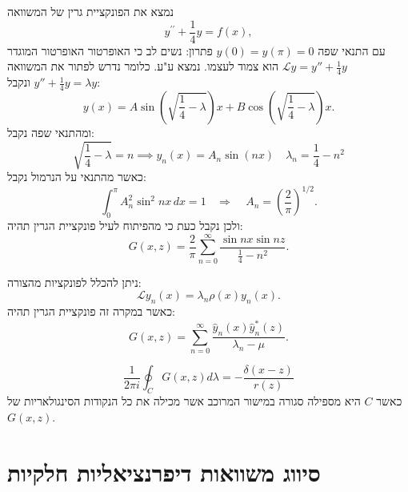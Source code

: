 \documentclass{tstextbook}
\begin{document}
\begin{example}
נמצא את הפונקציית גרין של המשוואה $$y^{\prime\prime}+{\textstyle{\frac{1}{4}}}y=f(x),$$
עם התנאי שפה \(y(0)=y\left( \pi \right)=0\)
פתרון:
נשים לב כי האופרטור האופרטור המוגדר \(\mathcal{L}y=y''+\frac{1}{4}y\) הוא צמוד לעצמו. נמצא ע"ע. כלומר נדרש לפתור את המשוואה \(y''+\frac{1}{4}y=\lambda y\) ונקבל:
$$y(x)=A\sin\left(\sqrt{{\frac{1}{4}}-\lambda}\right)x+B\cos\left(\sqrt{{\frac{1}{4}}-\lambda}\right)x.$$
ומהתנאי שפה נקבל:
$$\sqrt{{\textstyle{\frac{1}{4}}}-\lambda}=n \implies y_{n}(x)=A_{n}\sin(nx)\quad \lambda_{n}=\frac{1}{4}-n^2$$
כאשר מהתנאי על הנרמול נקבל:
$$\int_{0}^{\pi}A_{n}^{2}\sin^{2}n x\,d x=1~~~~\Rightarrow~~~~~A_{n}=\left({\frac{2}{\pi}}\right)^{1/2}.$$
ולכן נקבל כעת כי מהפיתוח לעיל פונקציית הגרין תהיה:
$$G(x,z)={\frac{2}{\pi}}\sum_{n=0}^{\infty}{\frac{\sin n x\sin n z}{{\frac{1}{4}}-n^{2}}}.$$

\end{example}
\begin{proposition}
ניתן להכלל לפונקציות מהצורה:
$${\mathcal L}y_{n}(x)=\lambda_{n}\rho(x)y_{n}(x).$$
כאשר במקרה זה פונקציית הגרין תהיה:
$$G(x,z)=\sum_{n=0}^{\infty}{\frac{{\hat{y}}_{n}(x){\hat{y}}_{n}^{*}(z)}{\lambda_{n}-\mu}}.$$

\end{proposition}
\begin{corollary}
$$\frac{1}{2\pi i}\oint_{C} G(x,z)d\lambda=-\frac{\delta(x-z)}{r(z)}$$
כאשר \(C\) היא מספילה סגורה במישור המרוכב אשר מכילה את כל הנקודות הסינגולאריות של \(G(x,z)\).

\end{corollary}

\section{סיווג משוואות דיפרנציאליות חלקיות}
\end{document}
